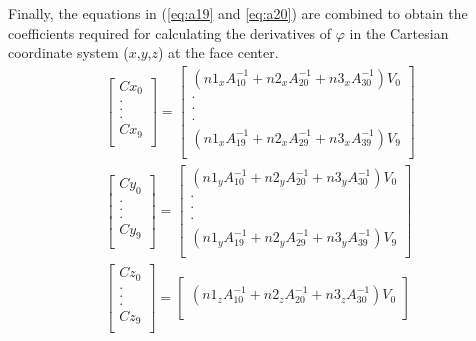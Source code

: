 Finally, the equations in (\ref{eq:a19} and \ref{eq:a20}) are combined to obtain the coefficients required for calculating the derivatives of ${\varphi}$ in the Cartesian coordinate system ($x$,$y$,$z$) at the face center.
\begin{equation}
    \label{eq:a21}
    \begin{gathered}
    \begin{bmatrix}
    Cx_0\\
    .\\
    .\\
    .\\
    Cx_9\\ \end{bmatrix}= \begin{bmatrix}
    (n1_xA^{-1}_{10}+n2_xA^{-1}_{20}+n3_xA^{-1}_{30})V_0\\
    \cdot\\
    \cdot\\
    \cdot\\
    (n1_xA^{-1}_{19}+n2_xA^{-1}_{29}+n3_xA^{-1}_{39})V_9\\
    \end{bmatrix}\\
     \begin{bmatrix}
    Cy_0\\
    .\\
    .\\
    .\\
    Cy_9\\ \end{bmatrix}= \begin{bmatrix}
    (n1_yA^{-1}_{10}+n2_yA^{-1}_{20}+n3_yA^{-1}_{30})V_0\\
    \cdot\\
    \cdot\\
    \cdot\\
    (n1_yA^{-1}_{19}+n2_yA^{-1}_{29}+n3_yA^{-1}_{39})V_9\\
    \end{bmatrix}\\
     \begin{bmatrix}
    Cz_0\\
    .\\
    .\\
    .\\
    Cz_9\\ \end{bmatrix}= \begin{bmatrix}
    (n1_zA^{-1}_{10}+n2_zA^{-1}_{20}+n3_zA^{-1}_{30})V_0\\

\end{bmatrix}
\end{gathered}
\end{equation}
